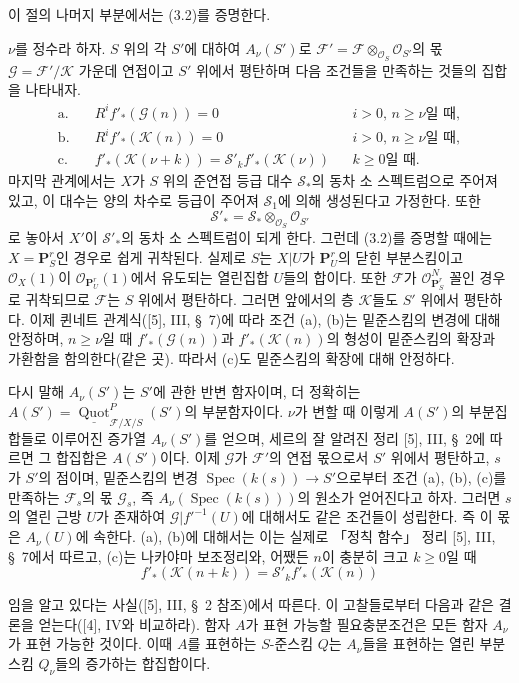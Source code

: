 \documentclass[11pt,twoside,openany]{book}
\numberwithin{equation}{section}
\newcommand{\sourceunit}{front}
\newcommand{\src}[1]{%
  \phantomsection\hypertarget{src:\sourceunit:#1}{}%
  \marginpar{\raggedleft\footnotesize\sffamily #1}%
}
\theoremstyle{plain}
\theoremstyle{definition}
\theoremstyle{remark}
\begin{document}
이 절의 나머지 부분에서는 (3.2)를 증명한다.

$\nu$를 정수라 하자. $S$ 위의 각 $S'$에 대하여 $A_\nu(S')$로
$\mathcal F'=\mathcal F\otimes_{\mathcal O_S}\mathcal O_{S'}$의
몫 $\mathcal G=\mathcal F'/\mathcal K$ 가운데 연접이고 $S'$ 위에서
평탄하며 다음 조건들을 만족하는 것들의 집합을 나타내자.
\begin{align*}
\text{a.}\quad &R^if'_*(\mathcal G(n))=0 &&\text{$i>0$, $n\geq\nu$일 때},\\
\text{b.}\quad &R^if'_*(\mathcal K(n))=0 &&\text{$i>0$, $n\geq\nu$일 때},\\
\text{c.}\quad &f'_*(\mathcal K(\nu+k))
=\mathcal S'_k f'_*(\mathcal K(\nu)) &&\text{$k\geq0$일 때}.
\end{align*}
마지막 관계에서는 $X$가 $S$ 위의 준연접 등급 대수 $\mathcal S_*$의
동차 소 스펙트럼으로 주어져 있고, 이 대수는 양의 차수로 등급이 주어져
$\mathcal S_1$에 의해 생성된다고 가정한다. 또한
\[
\mathcal S'_* =\mathcal S_*\otimes_{\mathcal O_S}\mathcal O_{S'}
\]
로 놓아서 $X'$이 $\mathcal S'_*$의 동차 소 스펙트럼이 되게 한다.
그런데 (3.2)를 증명할 때에는 $X=\mathbf P^r_S$인 경우로 쉽게
귀착된다. 실제로 $S$는 $X|U$가 $\mathbf P^r_U$의 닫힌 부분스킴이고
$\mathcal O_X(1)$이 $\mathcal O_{\mathbf P^r_U}(1)$에서 유도되는
열린집합 $U$들의 합이다. 또한 $\mathcal F$가
$\mathcal O_{\mathbf P^r_S}^{N}$ 꼴인 경우로 귀착되므로 $\mathcal F$는
$S$ 위에서 평탄하다. 그러면 앞에서의 층 $\mathcal K$들도 $S'$ 위에서
평탄하다. 이제 퀸네트 관계식([5], III, \S~7)에 따라 조건 (a), (b)는
밑준스킴의 변경에 대해 안정하며, $n\geq\nu$일 때
$f'_*(\mathcal G(n))$과 $f'_*(\mathcal K(n))$의 형성이 밑준스킴의
확장과 가환함을 함의한다(같은 곳). 따라서 (c)도 밑준스킴의 확장에
대해 안정하다.

다시 말해 $A_\nu(S')$는 $S'$에 관한 반변 함자이며, 더 정확히는
$A(S')=\underline{\operatorname{Quot}}^P_{\mathcal F/X/S}(S')$의
부분함자이다. $\nu$가 변할 때 이렇게 $A(S')$의 부분집합들로 이루어진
증가열 $A_\nu(S')$를 얻으며, 세르의 잘 알려진 정리 [5], III, \S~2에
따르면 그 합집합은 $A(S')$이다. 이제 $\mathcal G$가 $\mathcal F'$의
연접 몫으로서 $S'$ 위에서 평탄하고, $s$가 $S'$의 점이며, 밑준스킴의
변경 $\operatorname{Spec}(k(s))\longrightarrow S'$으로부터 조건 (a),
(b), (c)를 만족하는 $\mathcal F_s$의 몫 $\mathcal G_s$, 즉
$A_\nu(\operatorname{Spec}(k(s)))$의 원소가 얻어진다고 하자. 그러면
$s$의 열린 근방 $U$가 존재하여 $\mathcal G|f'^{-1}(U)$에 대해서도
같은 조건들이 성립한다. 즉 이 몫은 $A_\nu(U)$에 속한다. (a), (b)에
대해서는 이는 실제로 「정칙 함수」 정리 [5], III, \S~7에서 따르고,
(c)는 나카야마 보조정리와, 어쨌든 $n$이 충분히 크고 $k\geq0$일 때
\[
f'_*(\mathcal K(n+k))=\mathcal S'_k f'_*(\mathcal K(n))
\]
\src{261}
임을 알고 있다는 사실([5], III, \S~2 참조)에서 따른다. 이 고찰들로부터
다음과 같은 결론을 얻는다([4], IV와 비교하라). 함자 $A$가 표현 가능할
필요충분조건은 모든 함자 $A_\nu$가 표현 가능한 것이다. 이때 $A$를
표현하는 $S$-준스킴 $Q$는 $A_\nu$들을 표현하는 열린 부분스킴
$Q_\nu$들의 증가하는 합집합이다.
\end{document}
